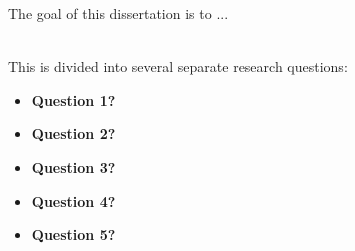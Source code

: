 The goal of this dissertation is to ...\\\

This is divided into several separate research questions:

\begin{itemize}
	\item \textbf{Question 1?
}
	
	\item \textbf{Question 2?}

	\item \textbf{Question 3?}
	
	\item \textbf{Question 4?}

	\item \textbf{Question 5?}
	
\end{itemize}